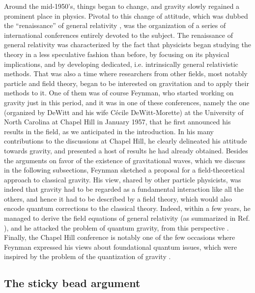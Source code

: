 \documentclass{ws-procs961x669}            %
\begin{document}
Around the mid-1950's, things began to change, and gravity slowly
regained a prominent place in physics. Pivotal to this change of
attitude, which was dubbed the ``renaissance'' of general
relativity \cite{Will:1989rr,Will,Blum:2020oel}, was the
organization of a series of international conferences entirely
devoted to the subject. The renaissance of general relativity was
characterized by the fact that physicists began studying the
theory in a less speculative fashion than before, by focusing on
its physical implications, and by developing dedicated, i.e.
intrinsically general relativistic methods. That was also a time
where researchers from other fields, most notably particle and
field theory, began to be interested on gravitation and to apply
their methods to it. One of them was of course Feynman, who
started working on gravity just in this period, and it was in one
of these conferences, namely the one (organized by DeWitt and his
wife C\'ecile DeWitt-Morette) at the University of North Carolina
at Chapel Hill in January 1957\cite{ChapelHill}, that he first
announced his results in the field, as we anticipated in the
introduction. In his many contributions to the discussions at
Chapel Hill, he clearly delineated his attitude towards gravity,
and presented a host of results he had already obtained. Besides
the arguments on favor of the existence of gravitational waves,
which we discuss in the following subsections, Feynman sketched a
proposal for a field-theoretical approach to classical gravity.
His view, shared by other particle physicists, was indeed that
gravity had to be regarded as a fundamental interaction like all
the others, and hence it had to be described by a field theory,
which would also encode quantum corrections to the classical
theory. Indeed, within a few years, he managed to derive the field
equations of general relativity (as summarized in Ref.
), and he attacked the problem of quantum
gravity, from this perspective
\cite{LectGravPreface,DiMauro:2021yza}. Finally, the Chapel Hill
conference is notably one of the few occasions where Feynman
expressed his views about foundational quantum issues, which were
inspired by the problem of the quantization of gravity
\cite{LectGravPreface,ChapelHill,DiMauro:2021yza,Zeh}.


\subsection{The sticky bead argument}
\end{document}
